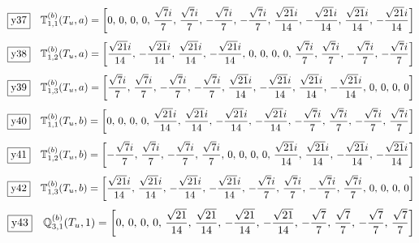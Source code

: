 \documentclass[fleqn,10pt,landscape]{jsarticle}
\begin{document}
\begin{dmath*}
\fbox{y37}\quad \mathbb{T}_{1,1}^{(b)}(T_{u},a)=\left[ 0,\, 0,\, 0,\, 0,\, \frac{\sqrt{7} i}{7},\, \frac{\sqrt{7} i}{7},\, - \frac{\sqrt{7} i}{7},\, - \frac{\sqrt{7} i}{7},\, \frac{\sqrt{21} i}{14},\, - \frac{\sqrt{21} i}{14},\, \frac{\sqrt{21} i}{14},\, - \frac{\sqrt{21} i}{14} \right]
\end{dmath*}
\begin{dmath*}
\fbox{y38}\quad \mathbb{T}_{1,2}^{(b)}(T_{u},a)=\left[ \frac{\sqrt{21} i}{14},\, - \frac{\sqrt{21} i}{14},\, \frac{\sqrt{21} i}{14},\, - \frac{\sqrt{21} i}{14},\, 0,\, 0,\, 0,\, 0,\, \frac{\sqrt{7} i}{7},\, \frac{\sqrt{7} i}{7},\, - \frac{\sqrt{7} i}{7},\, - \frac{\sqrt{7} i}{7} \right]
\end{dmath*}
\begin{dmath*}
\fbox{y39}\quad \mathbb{T}_{1,3}^{(b)}(T_{u},a)=\left[ \frac{\sqrt{7} i}{7},\, \frac{\sqrt{7} i}{7},\, - \frac{\sqrt{7} i}{7},\, - \frac{\sqrt{7} i}{7},\, \frac{\sqrt{21} i}{14},\, - \frac{\sqrt{21} i}{14},\, \frac{\sqrt{21} i}{14},\, - \frac{\sqrt{21} i}{14},\, 0,\, 0,\, 0,\, 0 \right]
\end{dmath*}
\begin{dmath*}
\fbox{y40}\quad \mathbb{T}_{1,1}^{(b)}(T_{u},b)=\left[ 0,\, 0,\, 0,\, 0,\, \frac{\sqrt{21} i}{14},\, \frac{\sqrt{21} i}{14},\, - \frac{\sqrt{21} i}{14},\, - \frac{\sqrt{21} i}{14},\, - \frac{\sqrt{7} i}{7},\, \frac{\sqrt{7} i}{7},\, - \frac{\sqrt{7} i}{7},\, \frac{\sqrt{7} i}{7} \right]
\end{dmath*}
\begin{dmath*}
\fbox{y41}\quad \mathbb{T}_{1,2}^{(b)}(T_{u},b)=\left[ - \frac{\sqrt{7} i}{7},\, \frac{\sqrt{7} i}{7},\, - \frac{\sqrt{7} i}{7},\, \frac{\sqrt{7} i}{7},\, 0,\, 0,\, 0,\, 0,\, \frac{\sqrt{21} i}{14},\, \frac{\sqrt{21} i}{14},\, - \frac{\sqrt{21} i}{14},\, - \frac{\sqrt{21} i}{14} \right]
\end{dmath*}
\begin{dmath*}
\fbox{y42}\quad \mathbb{T}_{1,3}^{(b)}(T_{u},b)=\left[ \frac{\sqrt{21} i}{14},\, \frac{\sqrt{21} i}{14},\, - \frac{\sqrt{21} i}{14},\, - \frac{\sqrt{21} i}{14},\, - \frac{\sqrt{7} i}{7},\, \frac{\sqrt{7} i}{7},\, - \frac{\sqrt{7} i}{7},\, \frac{\sqrt{7} i}{7},\, 0,\, 0,\, 0,\, 0 \right]
\end{dmath*}
\begin{dmath*}
\fbox{y43}\quad \mathbb{Q}_{3,1}^{(b)}(T_{u},1)=\left[ 0,\, 0,\, 0,\, 0,\, \frac{\sqrt{21}}{14},\, \frac{\sqrt{21}}{14},\, - \frac{\sqrt{21}}{14},\, - \frac{\sqrt{21}}{14},\, - \frac{\sqrt{7}}{7},\, \frac{\sqrt{7}}{7},\, - \frac{\sqrt{7}}{7},\, \frac{\sqrt{7}}{7} \right]
\end{dmath*}
\end{document}
